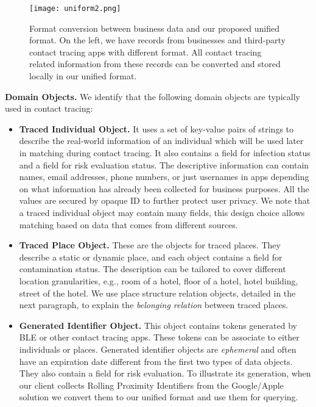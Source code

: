 \documentclass[11pt,dvipdfmx]{article}  %
\begin{document}
\begin{figure}
\centering
\texttt{[image: uniform2.png]}
\caption{Format conversion between business data and our proposed unified format. On the left, we have records from businesses and third-party contact tracing apps with different format. All contact tracing related information from these records can be converted and stored locally in our unified format.}
\label{busidata}
\end{figure}

\textbf{Domain Objects.} We identify that the following domain objects are typically used in contact tracing:
        \begin{itemize}
            \item \textbf{Traced Individual Object.} It uses a set of key-value pairs of strings to describe the real-world information of an individual which will be used later in matching during contact tracing. It also contains a field for infection status and a field for risk evaluation status. The descriptive information can contain names, email addresses, phone numbers, or just usernames in apps depending on what information has already been collected for business purposes. All the values are secured by opaque ID to further protect user privacy. We note that a traced individual object may contain many fields, this design choice allows matching based on data that comes from different sources. 
            
            \item \textbf{Traced Place Object. }These are the objects for traced places. 
            They describe a static or dynamic place, and each object contains a field for contamination status. 
            The description can be tailored to cover different location granularities, e.g., room of a hotel, floor of a hotel, hotel building, street of the hotel. We use place structure relation objects, detailed in the next paragraph, to explain the \emph{belonging relation} between traced places.
            
        
            \item \textbf{Generated Identifier Object. }This object contains tokens generated by BLE or other contact tracing apps. These tokens can be associate to either individuals or places. Generated identifier objects are \emph{ephemeral} and often have an expiration date different from the first two types of data  objects. They also contain a field for risk evaluation. To illustrate its generation, when our client collects Rolling Proximity Identifiers from the Google/Apple solution we convert them to our unified format and use them for querying. 

        
        \end{itemize}
\end{document}
